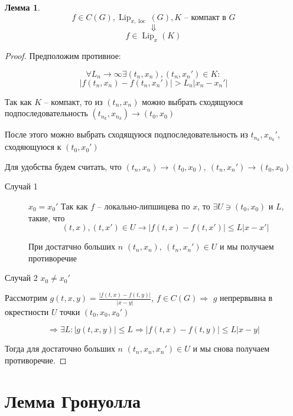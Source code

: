 \documentclass[a4paper]{article}
\theoremstyle{indented}
\newtheorem*{lemma}{Лемма}
\theoremstyle{definition}
\theoremstyle{remark}
\DeclareMathOperator{\Lip}{Lip}
\DeclareMathOperator{\loc}{loc}
\begin{document}
\begin{lemma}
  \[f \in C(G), \Lip_{x,\loc}(G), K \text{ -- компакт в } G\]
  \[\Downarrow \]
  \[f \in \Lip_x(K)\]
\end{lemma}
\begin{proof}
  Предположим противное:

  \[\forall L_n \to \infty  \exists (t_n,x_n), (t_n, x_n') \in K:\]
  \[|f(t_n,x_n) - f(t_n,x_n') | > L_n |x_n - x_n'|\]

  Так как $K$ -- компакт, то из $(t_n,x_n)$ можно выбрать сходящуюся подпоследовательность $(t_{n_k},x_{n_k}) \to (t_0, x_0)$

  После этого можно выбрать сходящуюся подпоследовательность из $t_{n_k}, x_{n_k}'$, сходяющуюся к $(t_0,x_0')$

  Для удобства будем считать, что $(t_n,x_n) \to (t_0,x_0), \ (t_n,x_n') \to (t_0,x_0)$
  \begin{description}
  \item[Случай 1] $x_0 = x_0'$
    Так как $f$ -- локально-липшицева по $x$, то $\exists U \ni (t_0,x_0)$ и $L$, такие, что
    \[(t,x), (t,x') \in U  \to |f(t,x) - f(t,x')| \leqslant L|x - x'|\]

    При достатчно больших $n$ $(t_n,x_n), \ (t_n,x_n') \in U$ и мы получаем противоречие
  \end{description}
\item[Случай 2] $x_0 \neq x_0'$

  Рассмотрим $g(t,x,y) = \frac{|f(t,x) - f(t,y)|}{|x-y|} $, $f \in C(G) \Rightarrow $ $g$ непрервывна в окрестности $U$ точки $(t_0,x_0,x_0')$

  \[\Rightarrow \exists L : |g(t,x,y)| \leqslant L \Rightarrow |f(t,x) - f(t,y)| \leqslant L|x-y|\]
  
  Тогда для достаточно больших $n$ $(t_n,x_n,x_n') \in U$ и мы снова получаем противоречие.
  
\end{proof}

\section{Лемма Гронуолла}
\end{document}
